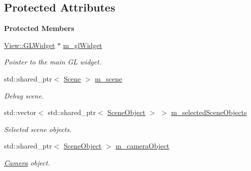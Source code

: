 \subsection*{Protected Attributes}
\begin{Indent}\textbf{ Protected Members}\par
\begin{DoxyCompactItemize}
\item 
\mbox{\label{classrev_1_1_debug_manager_a392268a27e041f6de47cda7a96bc2d1a}} 
\mbox{\hyperlink{classrev_1_1_view_1_1_g_l_widget}{View\+::\+G\+L\+Widget}} $\ast$ \mbox{\hyperlink{classrev_1_1_debug_manager_a392268a27e041f6de47cda7a96bc2d1a}{m\+\_\+gl\+Widget}}
\begin{DoxyCompactList}\small\item\em Pointer to the main GL widget. \end{DoxyCompactList}\item 
\mbox{\label{classrev_1_1_debug_manager_ab9fbd0e71075af201439d152612d8ec7}} 
std\+::shared\+\_\+ptr$<$ \mbox{\hyperlink{classrev_1_1_scene}{Scene}} $>$ \mbox{\hyperlink{classrev_1_1_debug_manager_ab9fbd0e71075af201439d152612d8ec7}{m\+\_\+scene}}
\begin{DoxyCompactList}\small\item\em Debug scene. \end{DoxyCompactList}\item 
\mbox{\label{classrev_1_1_debug_manager_af930d540f640b16fd9a14a3e3ebf668f}} 
std\+::vector$<$ std\+::shared\+\_\+ptr$<$ \mbox{\hyperlink{classrev_1_1_scene_object}{Scene\+Object}} $>$ $>$ \mbox{\hyperlink{classrev_1_1_debug_manager_af930d540f640b16fd9a14a3e3ebf668f}{m\+\_\+selected\+Scene\+Objects}}
\begin{DoxyCompactList}\small\item\em Selected scene objects. \end{DoxyCompactList}\item 
\mbox{\label{classrev_1_1_debug_manager_af648bde8cba1c2e5416f08afe187d3cc}} 
std\+::shared\+\_\+ptr$<$ \mbox{\hyperlink{classrev_1_1_scene_object}{Scene\+Object}} $>$ \mbox{\hyperlink{classrev_1_1_debug_manager_af648bde8cba1c2e5416f08afe187d3cc}{m\+\_\+camera\+Object}}
\begin{DoxyCompactList}\small\item\em \mbox{\hyperlink{classrev_1_1_camera}{Camera}} object. \end{DoxyCompactList}\item 

\end{DoxyCompactItemize}
\end{Indent}
